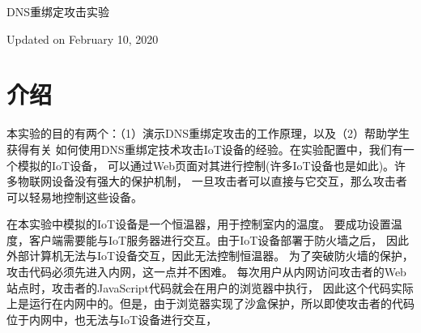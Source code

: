



\newcommand{\rebindingFigs}{./Figs}





\begin{center}
{\LARGE DNS重绑定攻击实验}

\vspace{0.05in}
Updated on February 10, 2020
\end{center}



\setcounter{task}{1}
\newcommand{\tasks} {\bf {\noindent (\arabic{task})} \addtocounter{task}{1} \,}



\section{介绍}


本实验的目的有两个：（1）演示DNS重绑定攻击的工作原理，以及（2）帮助学生获得有关
如何使用DNS重绑定技术攻击IoT设备的经验。在实验配置中，我们有一个模拟的IoT设备，
可以通过Web页面对其进行控制(许多IoT设备也是如此)。许多物联网设备没有强大的保护机制，
一旦攻击者可以直接与它交互，那么攻击者可以轻易地控制这些设备。


在本实验中模拟的IoT设备是一个恒温器，用于控制室内的温度。
要成功设置温度，客户端需要能与IoT服务器进行交互。由于IoT设备部署于防火墙之后，
因此外部计算机无法与IoT设备交互，因此无法控制恒温器。
为了突破防火墙的保护，攻击代码必须先进入内网，这一点并不困难。
每次用户从内网访问攻击者的Web站点时，攻击者的JavaScript代码就会在用户的浏览器中执行，
因此这个代码实际上是运行在内网中的。但是，由于浏览器实现了沙盒保护，所以即使攻击者的代码
位于内网中，也无法与IoT设备进行交互，


